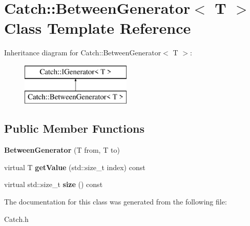 \hypertarget{class_catch_1_1_between_generator}{\section{Catch\-:\-:Between\-Generator$<$ T $>$ Class Template Reference}
\label{class_catch_1_1_between_generator}
}
Inheritance diagram for Catch\-:\-:Between\-Generator$<$ T $>$\-:\begin{figure}[H]
\begin{center}
\leavevmode
\includegraphics[height=2.000000cm]{class_catch_1_1_between_generator}
\end{center}
\end{figure}
\subsection*{Public Member Functions}
\begin{DoxyCompactItemize}
\item 
\hypertarget{class_catch_1_1_between_generator_a835a057d691ae37caef660624099b51c}{{\bfseries Between\-Generator} (T from, T to)}\label{class_catch_1_1_between_generator_a835a057d691ae37caef660624099b51c}

\item 
\hypertarget{class_catch_1_1_between_generator_af83575d62cc727ca995446cff4d6c26c}{virtual T {\bfseries get\-Value} (std\-::size\-\_\-t index) const }\label{class_catch_1_1_between_generator_af83575d62cc727ca995446cff4d6c26c}

\item 
\hypertarget{class_catch_1_1_between_generator_aa53a04a259e796ba2b5adabed79474b5}{virtual std\-::size\-\_\-t {\bfseries size} () const }\label{class_catch_1_1_between_generator_aa53a04a259e796ba2b5adabed79474b5}

\end{DoxyCompactItemize}


The documentation for this class was generated from the following file\-:\begin{DoxyCompactItemize}
\item 
Catch.\-h\end{DoxyCompactItemize}
